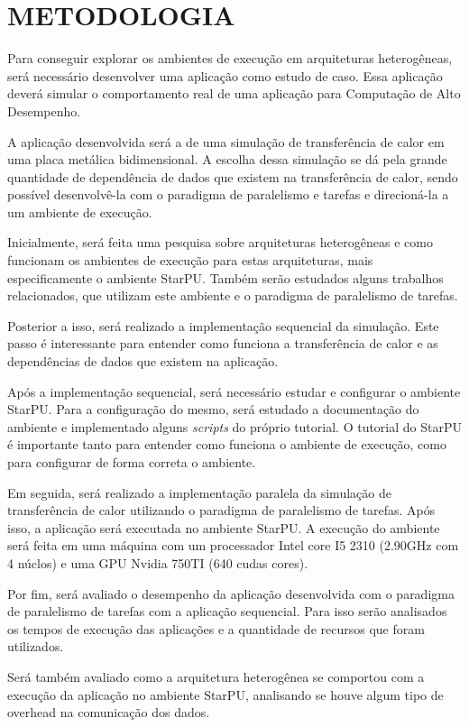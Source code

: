 
\chapter{METODOLOGIA}
\label{chap:metodologia}

Para conseguir explorar os ambientes de execução em arquiteturas heterogêneas, será necessário desenvolver uma aplicação como estudo de caso. Essa aplicação deverá simular o comportamento real de uma aplicação para Computação de Alto Desempenho. 

A aplicação desenvolvida será a de uma simulação de transferência de calor em uma placa metálica bidimensional. A escolha dessa simulação se dá pela grande quantidade de dependência de dados que existem na transferência de calor, sendo possível desenvolvê-la com o paradigma de paralelismo e tarefas e direcioná-la a um ambiente de execução.

Inicialmente, será feita uma pesquisa sobre arquiteturas heterogêneas e como funcionam os ambientes de execução para estas arquiteturas,
mais especificamente o ambiente StarPU.
Também serão estudados alguns trabalhos relacionados, que utilizam este ambiente e o paradigma de paralelismo de tarefas.

Posterior a isso, será realizado a implementação sequencial da simulação.
Este passo é interessante para entender como funciona a transferência de calor e as dependências de dados que existem na aplicação.

Após a implementação sequencial, será necessário estudar e configurar o ambiente StarPU. Para a configuração do mesmo,
será estudado a documentação do ambiente e implementado alguns \textit{scripts} do próprio tutorial.
O tutorial do StarPU é importante tanto para entender como funciona o ambiente de execução, como para configurar de forma correta o ambiente.

Em seguida, será realizado a implementação paralela da simulação de transferência de calor utilizando o paradigma de paralelismo de tarefas.
Após isso, a aplicação será executada no ambiente StarPU. 
A execução do ambiente será feita em uma máquina com um processador Intel core I5 2310 (2.90GHz com 4 núclos) e uma GPU Nvidia 750TI (640 cudas cores).

Por fim, será avaliado o desempenho da aplicação desenvolvida com o paradigma de paralelismo de tarefas com a aplicação sequencial. Para isso serão analisados os tempos de execução das aplicações e a quantidade de recursos que foram utilizados.

Será também avaliado como a arquitetura heterogênea se comportou com a execução da aplicação no ambiente StarPU, analisando se houve algum tipo de overhead na comunicação dos dados.